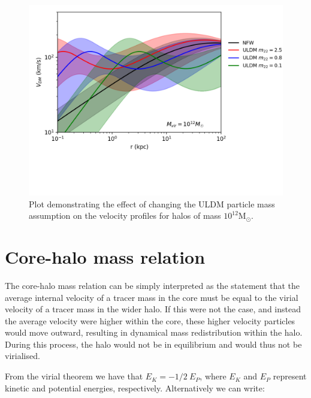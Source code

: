 \documentclass{pasa}%
\begin{document}
\begin{appendix}

\begin{figure}[t]
\centering
\includegraphics[scale = 0.8, trim={0cm 2.5cm 1cm 0cm}]{000_comp_10_12.png} 
\caption{Plot demonstrating the effect of changing the ULDM particle mass assumption on the velocity profiles for halos of mass $10^{12}\mathrm{M}_{\odot}$.}\label{fig:vel_5_10_11}
\end{figure}

\section{Core-halo mass relation}\label{app:core-halo}

 The core-halo mass relation can be simply interpreted as the statement that the average internal velocity of a tracer mass in the core must be equal to the virial velocity of a tracer mass in the wider halo. If this were not the case, and instead the average velocity were higher within the core, these higher velocity particles would move outward, resulting in dynamical mass redistribution within the halo. During this process, the halo would not be in equilibrium and would thus not be virialised.

From the virial theorem we have that $E_K=-1/2 \ E_P$, where $E_K$ and $E_P$ represent kinetic and potential energies, respectively. Alternatively we can write:


\end{appendix}
\end{document}
